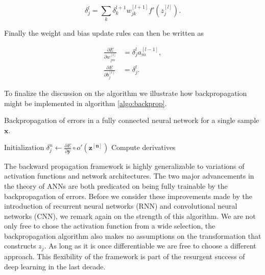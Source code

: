\begin{equation}\label{eq:dl}
\delta_j^l = \sum_k \delta ^{l+1}_k w^{[l+1]}_{jk} f'(z_j^{[l]}).
\end{equation}

\noindent Finally the weight and bias update rules can then be written as 

\begin{align}
\frac{\partial E}{\partial w_{jm}^{[l]}} &= \delta_j^l a^{[l-1]}_m, \\
\frac{\partial E}{\partial b_{j}^{[l]}} &= \delta_j^l .
\end{align}

\noindent To finalize the discussion on the algorithm we illustrate how backpropagation might be implemented in algorithm \ref{algo:backprop}.

\begin{algorithm}
\caption{Backpropagation of errors in a fully connected neural network for a single sample $\mathbf{x}$.}\label{algo:backprop}
Initialization\;
$\delta_j^{n} \gets \frac{\partial E}{\partial \mathbf{y}} \circ o'(\mathbf{z^{[n]}})$\;
Compute derivatives\;  
\end{algorithm}

The backward propagation framework is highly generalizable to variations of activation functions and network architectures. The two major advancements in the theory of ANNs are both predicated on being fully trainable by the backpropagation of errors. Before we consider these improvements made by the introduction of recurrent neural networks (RNN) and convolutional neural networks (CNN), we remark again on the strength of this algorithm. We are not only free to chose the activation function from a wide selection, the backpropagation algorithm also makes no assumptions on the transformation that constructs $z_j$. As long as it is once differentiable we are free to choose a different approach. This flexibility of the framework is part of the resurgent success of deep learning in the last decade. 

